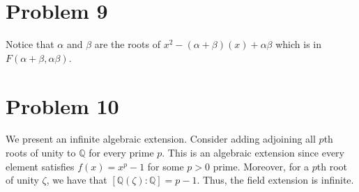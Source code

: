 \documentclass{article}
\theoremstyle{definition}
\begin{document}
\section{Problem 9}

Notice that $ \alpha $ and $ \beta $ are the roots of $ x^{2} - (\alpha + \beta)(x) + \alpha \beta $
which is in $ F(\alpha + \beta, \alpha \beta) $.

\section{Problem 10}

We present an infinite algebraic extension. Consider adding adjoining
all $ p $th roots of unity to $ \mathbb{Q} $ for every prime $ p $. This
is an algebraic extension since every element satisfies $ f(x) = x^{p} - 1 $
for some $ p > 0 $ prime. Moreover, for a $ p $th root of unity $ \zeta $,
we have that $ [\mathbb{Q}(\zeta) : \mathbb{Q}] = p - 1 $. Thus, the field extension is infinite.
\end{document}
